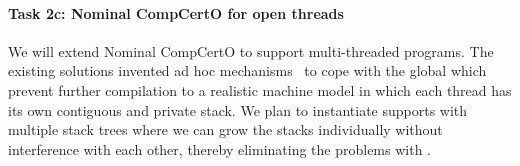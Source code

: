 \vspace*{-2ex}
\paragraph*{Task 2c: Nominal CompCertO for open threads}
We will extend Nominal CompCertO to support
multi-threaded programs. The existing solutions invented ad hoc
mechanisms~\cite{ccal18} to cope with the global \nextblock which
prevent further compilation to a realistic machine model in which each
thread has its own contiguous and private stack. We plan to
instantiate supports with multiple stack trees where we can grow
the stacks individually without interference with each other, thereby
eliminating the problems with \nextblock.



